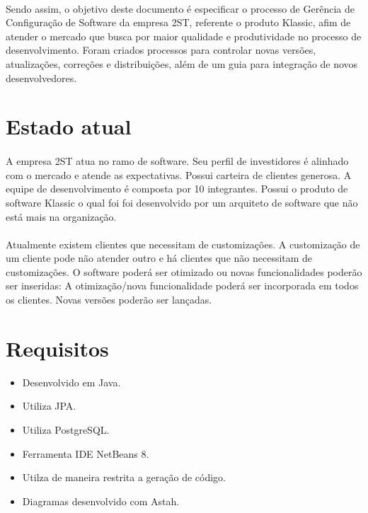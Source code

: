 \documentclass[	DIV=calc,%
							paper=a4,%
							fontsize=12pt,%
							onecolumn]{scrartcl}	 					%
\begin{document}
\paragraph{}
Sendo assim, o objetivo deste documento  é especificar o processo de Gerência de Configuração de Software da empresa 2ST, referente o produto Klassic, afim de atender o mercado que busca por maior qualidade e produtividade no processo de desenvolvimento. Foram criados processos para controlar novas versões, atualizações, correções e distribuições, além de um guia para integração de novos desenvolvedores.

\section{Estado atual}
\paragraph{}
A empresa 2ST atua no ramo de software. Seu perfil de investidores  é alinhado com o mercado e atende as expectativas. Possui carteira de clientes generosa. A equipe de desenvolvimento é composta por 10 integrantes. Possui o produto de software Klassic o qual foi foi desenvolvido por um arquiteto de software que não está mais na organização.
\paragraph{}
Atualmente existem clientes que necessitam de customizações. A customização de um cliente pode não atender outro e há clientes que não necessitam de customizações. O software poderá ser otimizado ou novas funcionalidades poderão ser inseridas: A otimização/nova funcionalidade poderá ser incorporada em todos os clientes. Novas versões poderão ser lançadas.


\section{Requisitos}
\begin{itemize}
	\item Desenvolvido em Java.
	\item Utiliza JPA.
	\item Utiliza PostgreSQL.
	\item Ferramenta IDE NetBeans 8.
	\item Utilza de maneira restrita a geração de código.
	\item Diagramas desenvolvido com Astah.
\end{itemize}
\end{document}

